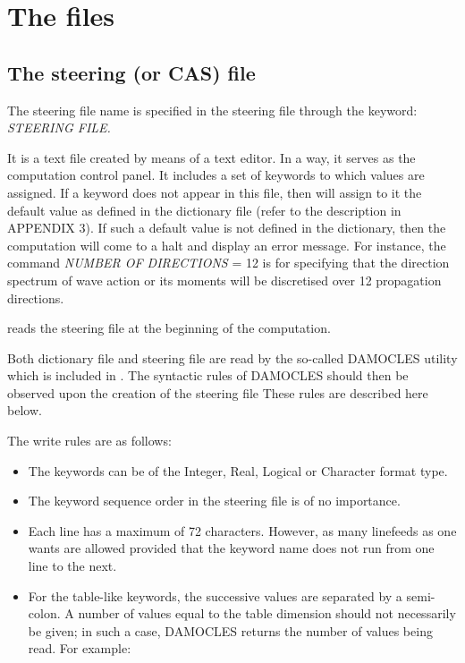 \section{ The files}


\subsection{ The steering (or CAS) file}
\label{se:steeringfile}
 The steering file name is specified in the steering file through the keyword: \textit{STEERING FILE.}

 It is a text file created by means of a text editor. In a way, it serves as the computation control panel. It includes a set of keywords to which values are assigned. If a keyword does not appear in this file, then \tomawac will assign to it the default value as defined in the dictionary file (refer to the description in APPENDIX 3). If such a default value is not defined in the dictionary, then the computation will come to a halt and display an error message. For instance, the command \textit{NUMBER OF DIRECTIONS} = 12 is for specifying that the direction spectrum of wave action or its moments will be discretised over 12 propagation directions.

 \tomawac reads the steering file at the beginning of the computation.

 Both dictionary file and steering file are read by the so-called DAMOCLES utility which is included in \tomawac. The syntactic rules of DAMOCLES should then be observed upon the creation of the steering file These rules are described here below.

 The write rules are as follows:

\begin{itemize}
\item  The keywords can be of the Integer, Real, Logical or Character format type.

\item  The keyword sequence order in the steering file is of no importance.

\item  Each line has a maximum of 72 characters. However, as many linefeeds as one wants are allowed provided that the keyword name does not run from one line to the next.

\item  For the table-like keywords, the successive values are separated by a semi-colon. A number of values equal to the table dimension should not necessarily be given; in such a case, DAMOCLES returns the number of values being read. For example:
\end{itemize}

